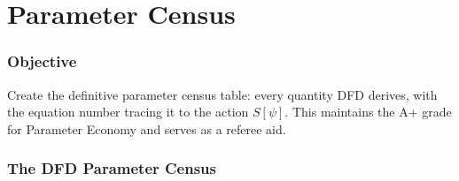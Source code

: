 \documentclass[11pt,a4paper]{article}
\theoremstyle{remark}
\begin{document}
\newpage
\part{Parameter Census}
\label{part:census}

\section{Objective}

Create the definitive parameter census table: every quantity DFD derives,
with the equation number tracing it to the action $S[\psi]$. This maintains
the A+ grade for Parameter Economy and serves as a referee aid.

\section{The DFD Parameter Census}
\end{document}
